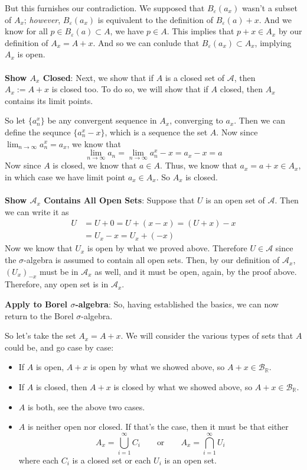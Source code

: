 \documentclass[12pt]{article}
\theoremstyle{plain}
\theoremstyle{definition}
\theoremstyle{remark}
\begin{document}
\begin{enumerate}
But this furnishes our contradiction.  We supposed that $B_\varepsilon(a_x)$ wasn't a subset of $A_x$; \emph{however}, $B_\varepsilon(a_x)$ is equivalent to the definition of $B_\varepsilon(a) + x$. And we know for all $p \in B_\varepsilon(a)\subset A$, we have $p\in A$. This implies that $p+x \in A_x$ by our definition of $A_x = A+x$. And so we can conlude that $B_\varepsilon(a_x)\subset A_x$, implying $A_x$ is open.
\\
\\
\textbf{Show $A_x$ Closed}: Next, we show that if $A$ is a closed set of $\mathscr{A}$, then $A_x := A + x$ is closed too. To do so, we will show that if $A$ closed, then $A_x$ contains its limit points.

So let $\{a^x_n\}$ be any convergent sequence in $A_x$, converging to $a_x$. Then we can define the sequnce $\{a^x_n - x\}$, which is a sequence the set $A$. Now since $\lim_{n\rightarrow\infty} a^x_n = a_x$, we know that 
\[
    \lim_{n\rightarrow\infty} a_n =
    \lim_{n\rightarrow\infty} a^x_n - x = a_x - x = a
\]
Now since $A$ is closed, we know that $a\in A$. Thus, we know that $a_x = a + x\in A_x$, in which case we have limit point $a_x \in A_x$. So $A_x$ is closed.
\\
\\
\textbf{Show $\mathscr{A}_x$ Contains All Open Sets}: Suppose that $U$ is an open set of $\mathscr{A}$. Then we can write it as
\begin{align*}
    U &= U + 0 = U + (x-x) = (U + x) - x \\
    &= U_x - x = U_x + (-x)
\end{align*}
Now we know that $U_x$ is open by what we proved above. Therefore $U\in\mathscr{A}$ since the $\sigma$-algebra is assumed to contain all open sets. Then, by our definition of $\mathscr{A}_x$, $\left(U_x\right)_{-x}$ must be in $\mathscr{A}_x$ as well, and it must be open, again, by the proof above. Therefore, any open set is in $\mathscr{A}_x$.

\textbf{Apply to Borel $\sigma$-algebra}: So, having established the basics, we can now return to the Borel $\sigma$-algebra. 

So let's take the set $A_x = A + x$. We will consider the various types of sets that $A$ could be, and go case by case:
\begin{itemize}
    \item If $A$ is open, $A+x$ is open by what we showed above, so $A+x\in\mathscr{B}_\mathbb{R}$.
    \item If $A$ is closed, then $A+x$ is closed by what we showed above, so $A+x \in\mathscr{B}_\mathbb{R}$.
    \item $A$ is both, see the above two cases.
    \item $A$ is neither open nor closed. If that's the case, then it must be that either
        \[
            A_x = \bigcup^\infty_{i=1} C_i 
            \qquad \text{or}\qquad
            A_x = \bigcap^\infty_{i=1} U_i 
        \]
    where each $C_i$ is a closed set or each $U_i$ is an open set. 
    

\end{itemize}
\end{enumerate}
\end{document}
